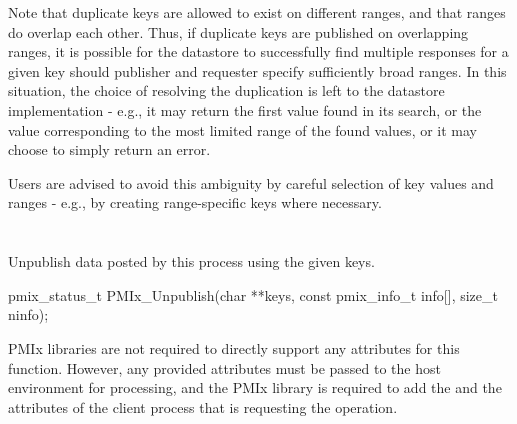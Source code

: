 \adviceuserstart
Note that duplicate keys are allowed to exist on different ranges, and that ranges do overlap each other. Thus, if duplicate keys are published on overlapping ranges, it is possible for the datastore to successfully find multiple responses for a given key should publisher and requester specify sufficiently broad ranges. In this situation, the choice of resolving the duplication is left to the datastore implementation - e.g., it may return the first value found in its search, or the value corresponding to the most limited range of the found values, or it may choose to simply return an error.

Users are advised to avoid this ambiguity by careful selection of key values and ranges - e.g., by creating range-specific keys where necessary.
\adviceuserend


\section{}

\summary

Unpublish data posted by this process using the given keys.

\format

\cspecificstart
\begin{codepar}
pmix_status_t
PMIx_Unpublish(char **keys,
               const pmix_info_t info[], size_t ninfo);
\end{codepar}
\cspecificend

\begin{arglist}
\end{arglist}

\returnsimple

\reqattrstart
\ac{PMIx} libraries are not required to directly support any attributes for this function. However, any provided attributes must be passed to the host environment for processing, and the \ac{PMIx} library is required to add the  and the  attributes of the client process that is requesting the operation.

\reqattrend

